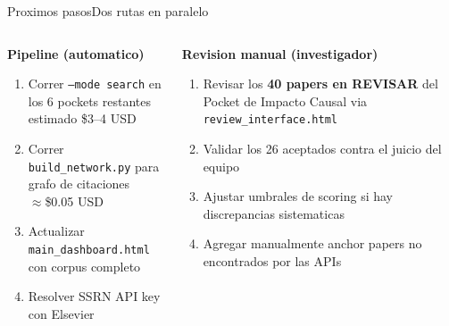 \documentclass[aspectratio=169,10pt]{beamer}
\newenvironment{card}[1][cardbg]{%
  \begin{tcolorbox}[colback=#1,colframe=bidlight!40,arc=4pt,
    boxrule=0.4pt,left=5pt,right=5pt,top=4pt,bottom=4pt]}%
  {\end{tcolorbox}}
\begin{document}
\begin{frame}{Proximos pasos}{Dos rutas en paralelo}
\begin{columns}[T]
\begin{card}
\small\textbf{\color{bidaccent}Pipeline (automatico)}\\[5pt]
\scriptsize\color{bidgray}
\begin{enumerate}\setlength\itemsep{5pt}
  \item Correr \texttt{--mode search} en los 6 pockets restantes \\ estimado \$3--4 USD
  \item Correr \texttt{build\_network.py} para grafo de citaciones \\ $\approx$\$0.05 USD
  \item Actualizar \texttt{main\_dashboard.html} con corpus completo
  \item Resolver SSRN API key con Elsevier
\end{enumerate}
\end{card}

\begin{card}
\small\textbf{\color{bidaccent}Revision manual (investigador)}\\[5pt]
\scriptsize\color{bidgray}
\begin{enumerate}\setlength\itemsep{5pt}
  \item Revisar los \textbf{40 papers en REVISAR} del Pocket de Impacto Causal via \texttt{review\_interface.html}
  \item Validar los 26 aceptados contra el juicio del equipo
  \item Ajustar umbrales de scoring si hay discrepancias sistematicas
  \item Agregar manualmente anchor papers no encontrados por las APIs
\end{enumerate}
\end{card}
\end{columns}

\vspace{5mm}
\begin{center}
\end{center}
\end{frame}
\end{document}
